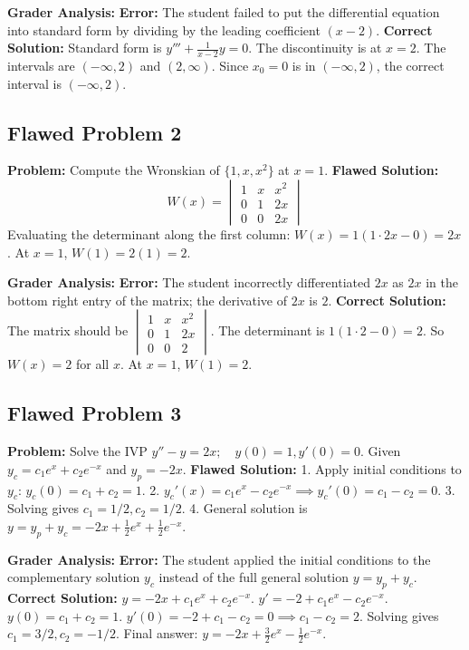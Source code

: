\documentclass[11pt,letterpaper]{article}
\begin{document}
\textbf{Grader Analysis:}
\textbf{Error:} The student failed to put the differential equation into standard form by dividing by the leading coefficient $(x-2)$.
\textbf{Correct Solution:} Standard form is $y''' + \frac{1}{x-2}y = 0$. The discontinuity is at $x=2$. The intervals are $(-\infty, 2)$ and $(2, \infty)$. Since $x_0 = 0$ is in $(-\infty, 2)$, the correct interval is $(-\infty, 2)$.

\subsection{Flawed Problem 2}
\textbf{Problem:} Compute the Wronskian of $\{1, x, x^2\}$ at $x=1$.
\textbf{Flawed Solution:}
\[ W(x) = \begin{vmatrix} 1 & x & x^2 \\ 0 & 1 & 2x \\ 0 & 0 & 2x \end{vmatrix} \]
Evaluating the determinant along the first column: $W(x) = 1(1 \cdot 2x - 0) = 2x$.
At $x=1$, $W(1) = 2(1) = 2$.

\textbf{Grader Analysis:}
\textbf{Error:} The student incorrectly differentiated $2x$ as $2x$ in the bottom right entry of the matrix; the derivative of $2x$ is $2$.
\textbf{Correct Solution:} The matrix should be $\begin{vmatrix} 1 & x & x^2 \\ 0 & 1 & 2x \\ 0 & 0 & 2 \end{vmatrix}$. The determinant is $1(1 \cdot 2 - 0) = 2$. So $W(x) = 2$ for all $x$. At $x=1$, $W(1) = 2$.

\subsection{Flawed Problem 3}
\textbf{Problem:} Solve the IVP $y'' - y = 2x; \quad y(0)=1, y'(0)=0$. Given $y_c = c_1 e^x + c_2 e^{-x}$ and $y_p = -2x$.
\textbf{Flawed Solution:}
1. Apply initial conditions to $y_c$: $y_c(0) = c_1 + c_2 = 1$.
2. $y_c'(x) = c_1 e^x - c_2 e^{-x} \implies y_c'(0) = c_1 - c_2 = 0$.
3. Solving gives $c_1 = 1/2, c_2 = 1/2$.
4. General solution is $y = y_p + y_c = -2x + \frac{1}{2}e^x + \frac{1}{2}e^{-x}$.

\textbf{Grader Analysis:}
\textbf{Error:} The student applied the initial conditions to the complementary solution $y_c$ instead of the full general solution $y = y_p + y_c$.
\textbf{Correct Solution:} $y = -2x + c_1 e^x + c_2 e^{-x}$. $y' = -2 + c_1 e^x - c_2 e^{-x}$. $y(0) = c_1 + c_2 = 1$. $y'(0) = -2 + c_1 - c_2 = 0 \implies c_1 - c_2 = 2$. Solving gives $c_1 = 3/2, c_2 = -1/2$. Final answer: $y = -2x + \frac{3}{2}e^x - \frac{1}{2}e^{-x}$.
\end{document}
